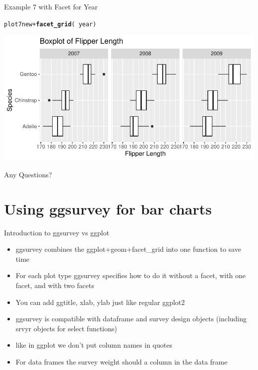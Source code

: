 \documentclass{beamer}\usepackage[]{graphicx}\usepackage[]{xcolor}
\makeatletter
\newcommand{\hlopt}[1]{\textcolor[rgb]{0,0,0}{#1}}%
\newcommand{\hlstd}[1]{\textcolor[rgb]{0.345,0.345,0.345}{#1}}%
\newcommand{\hlkwd}[1]{\textcolor[rgb]{0.737,0.353,0.396}{\textbf{#1}}}%
\newenvironment{kframe}{%
 \def\at@end@of@kframe{}%
 \ifinner\ifhmode%
  \def\at@end@of@kframe{\end{minipage}}%
  \begin{minipage}{\columnwidth}%
 \fi\fi%
 \def\FrameCommand##1{\hskip\@totalleftmargin \hskip-\fboxsep
 \colorbox{shadecolor}{##1}\hskip-\fboxsep
     \hskip-\linewidth \hskip-\@totalleftmargin \hskip\columnwidth}%
 \MakeFramed {\advance\hsize-\width
   \@totalleftmargin\z@ \linewidth\hsize
   \@setminipage}}%
 {\par\unskip\endMakeFramed%
 \at@end@of@kframe}
\newenvironment{knitrout}{}{} %
\makeatother
\begin{document}
\begin{frame}[fragile]{Example 7 with Facet for Year}
\begin{knitrout}
\color{fgcolor}\begin{kframe}
\begin{alltt}
\hlstd{plot7new} \hlopt{+} \hlkwd{facet_grid}\hlstd{(}\hlopt{~}\hlstd{year)}
\end{alltt}
\end{kframe}
\includegraphics[width=0.95\linewidth]{figure/unnamed-chunk-38-1} 
\end{knitrout}
\end{frame}

\begin{frame}{Any Questions?}
\end{frame}
\section{Using ggsurvey for bar charts}
\begin{frame}{Introduction to ggsurvey vs ggplot}
\begin{itemize}
\item ggsurvey combines the ggplot+geom+facet\_grid into one function to save time
\item For each plot type ggsurvey specifies how to do it without a facet, with one facet, and with two facets
\item You can add ggtitle, xlab, ylab just like regular ggplot2
\item ggsurvey is compatible with dataframe and survey design objects (including srvyr objects for select functions)
\item like in ggplot we don't put column names in quotes
\item For data frames the survey weight should a column in the data frame
\end{itemize}
\end{frame}
\end{document}
